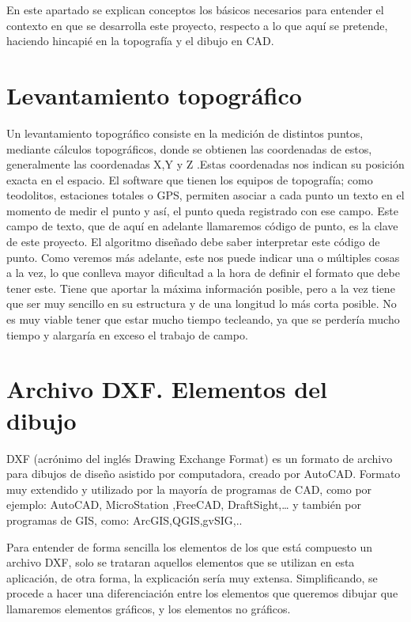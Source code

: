 
En este apartado se explican conceptos los básicos necesarios para entender el contexto en que se desarrolla este proyecto, respecto a lo que aquí se pretende, haciendo hincapié en la topografía y el dibujo en CAD. 

\section{Levantamiento topográfico}

Un levantamiento topográfico consiste en la medición de distintos puntos, mediante cálculos topográficos, donde se obtienen las coordenadas de estos, generalmente las coordenadas X,Y y Z .Estas coordenadas nos indican su posición exacta en el espacio. 
El software que tienen los equipos de topografía; como teodolitos, estaciones totales o GPS, permiten asociar a cada punto un texto en el momento de medir el punto y así, el punto queda registrado con ese campo.
Este campo de texto, que de aquí en adelante llamaremos código de punto, es la clave de este proyecto. El algoritmo diseñado debe saber interpretar este código de punto. Como veremos más adelante, este nos puede indicar una o múltiples cosas a la vez, lo que conlleva mayor dificultad a la hora de definir el formato que debe tener este. Tiene que aportar la máxima información posible, pero a la vez tiene que ser muy sencillo en su estructura y de una longitud lo más corta posible. No es muy viable tener que estar mucho tiempo tecleando, ya que se perdería mucho tiempo y alargaría en exceso el trabajo de campo.

\section{Archivo DXF. Elementos del dibujo}

DXF (acrónimo del inglés Drawing Exchange Format) es un formato de archivo para dibujos de diseño asistido por computadora, creado por AutoCAD. Formato muy extendido y utilizado por la mayoría de programas de CAD, como por ejemplo: AutoCAD, MicroStation ,FreeCAD,  DraftSight,… y también por programas de GIS, como: ArcGIS,QGIS,gvSIG,..

Para entender de forma sencilla los elementos de los que está compuesto un archivo DXF, solo se trataran aquellos elementos que se utilizan en esta aplicación, de otra forma, la explicación sería muy extensa.
Simplificando, se procede a hacer una diferenciación entre los elementos que queremos dibujar que llamaremos elementos gráficos, y los elementos no gráficos.

